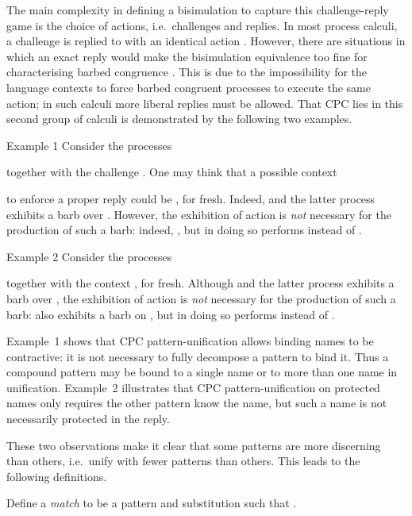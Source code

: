 \documentclass{LMCS}
\begin{document}
The main complexity in defining a bisimulation to capture this challenge-reply game is the choice of actions, i.e.\ challenges and replies.
In most process calculi, a challenge is replied to with an identical action \cite{Mil89,milner.parrow.ea:calculus-mobile}.
However, there are situations in which an exact reply would make the bisimulation equivalence too fine for characterising barbed congruence \cite{amadio.castellani.ea:bisimulations-asynchronous,DGP:IC07}.
This is due to the impossibility for the language contexts to force barbed congruent processes to execute the same action; in such calculi more liberal replies must be allowed. That CPC lies in this second group of calculi is demonstrated by the following two examples.

\begin{exa}{Example 1}
\label{ex:input}
Consider the processes

together with the challenge .
One may think that a possible context

to enforce a proper reply could be , for  fresh.
Indeed, 
and the latter process exhibits a barb over .
However, the exhibition of action  is {\em not} necessary
for the production of such a barb: indeed,
,
but in doing so  performs  instead of .
\end{exa}

\begin{exa}{Example 2}
\label{ex:pro}
Consider the processes

together with the context , for  fresh.
Although  and the latter process exhibits a barb over ,
the exhibition of action  is {\em not} necessary for the production of such a barb:
 also exhibits a barb on ,
but in doing so  performs  instead of .
\end{exa}

\medskip

Example~1 shows that CPC pattern-unification allows binding names to be contractive: 
it is not necessary to fully decompose a pattern to bind it.
Thus a compound pattern may be bound to a single name or to more than one name in unification.
Example~2 illustrates that CPC pattern-unification on protected names only requires the other pattern know the name, but such a name is not necessarily protected in the reply.

These two observations make it clear that some patterns are more discerning than others,
i.e.\ unify with fewer patterns than others. This leads to the following definitions.

\begin{defi}
\label{def:match}
Define a {\em match}  to be a pattern  and substitution  such that
.
\end{defi}
\end{document}
